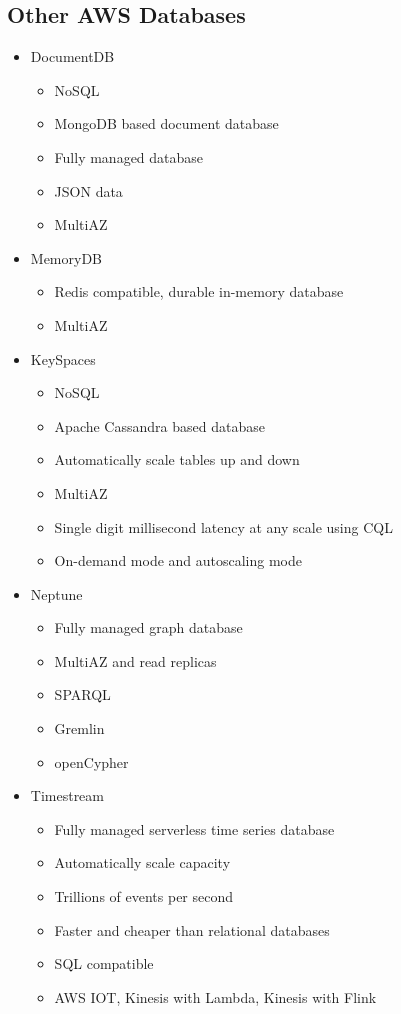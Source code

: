 \documentclass[../main.tex]{subfiles}
\begin{document}
\subsection{Other AWS Databases}
\begin{itemize}
    \item DocumentDB
    \begin{itemize}
        \item NoSQL
        \item MongoDB based document database
        \item Fully managed database
        \item JSON data
        \item MultiAZ
    \end{itemize}
    \item MemoryDB
    \begin{itemize}
        \item Redis compatible, durable in-memory database
        \item MultiAZ
    \end{itemize}
    \item KeySpaces
    \begin{itemize}
        \item NoSQL
        \item Apache Cassandra based database
        \item Automatically scale tables up and down
        \item MultiAZ
        \item Single digit millisecond latency at any scale using CQL
        \item On-demand mode and autoscaling mode
    \end{itemize}
    \item Neptune
    \begin{itemize}
        \item Fully managed graph database
        \item MultiAZ and read replicas
        \item SPARQL
        \item Gremlin
        \item openCypher
    \end{itemize}
    \item Timestream
    \begin{itemize}
        \item Fully managed serverless time series database
        \item Automatically scale capacity
        \item Trillions of events per second
        \item Faster and cheaper than relational databases
        \item SQL compatible
        \item AWS IOT, Kinesis with Lambda, Kinesis with Flink
    \end{itemize}
\end{itemize}
\end{document}
